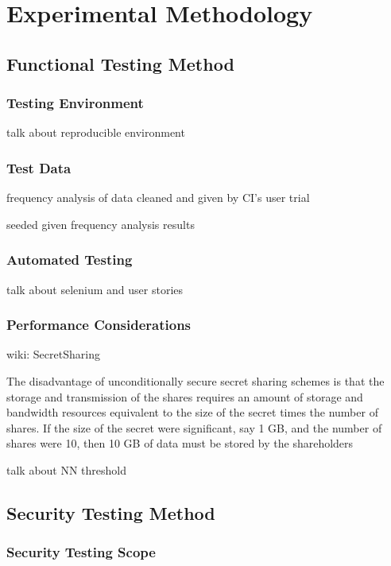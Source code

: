 \chapter{Experimental Methodology}

\section{Functional Testing Method}

\subsection{Testing Environment}

talk about reproducible environment

\subsection{Test Data}

frequency analysis of data cleaned and given by CI's user trial

seeded given frequency analysis results

\subsection{Automated Testing}

talk about selenium and user stories

\subsection{Performance Considerations}

wiki: SecretSharing

The disadvantage of unconditionally secure secret sharing schemes is that the storage and transmission of the shares requires an amount of storage and bandwidth resources equivalent to the size of the secret times the number of shares. If the size of the secret were significant, say 1 GB, and the number of shares were 10, then 10 GB of data must be stored by the shareholders

talk about NN threshold

\section{Security Testing Method}

\subsection{Security Testing Scope}


